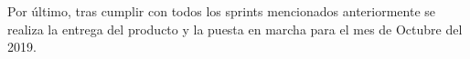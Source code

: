 Por último, tras cumplir con todos los sprints mencionados anteriormente se realiza la entrega del producto y la puesta en marcha para el mes de Octubre del 2019.












